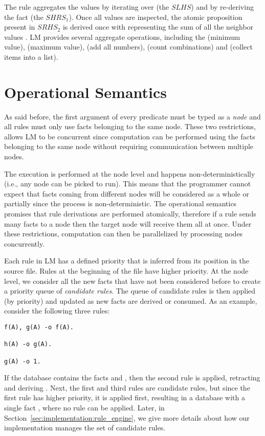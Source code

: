 The rule aggregates the values  by iterating over
 (the $SLHS$) and by re-deriving the
fact  (the $SHRS_1$). Once all
values are inspected, the atomic proposition  present in
$SRHS_2$ is derived once with  representing the sum of all the
neighbor values . LM provides several aggregate operations, including the
 (minimum value),  (maximum value),  (add all
numbers),  (count combinations) and  (collect items
into a list).

\section{Operational Semantics}

As said before, the first argument of every predicate must be typed as a
\emph{node} and all rules must only use facts belonging to the same node. These
two restrictions, allows LM to be concurrent since computation can be performed
using the facts belonging to the same node without requiring communication
between multiple nodes.

The execution is performed at the node level and happens non-deterministically
(i.e., any node can be picked to run). This means that the programmer cannot
expect that facts coming from different nodes will be considered as a whole or
partially since the process is non-deterministic. The operational semantics
promises that rule derivations are performed atomically, therefore if a rule
sends many facts to a node then the target node will receive them all at once.
Under these restrictions, computation can then be parallelized by processing
nodes concurrently.

Each rule in LM has a defined priority that is inferred from its position in the
source file.  Rules at the beginning of the file have higher priority. At the
node level, we consider all the new facts that have not been considered before
to create a priority queue of \emph{candidate rules}. The queue of candidate
rules is then applied (by priority) and updated as new facts are derived or
consumed. As an example, consider the following three rules:

\begin{Verbatim}[fontsize=\codesize]
f(A), g(A) -o f(A).

h(A) -o g(A).

g(A) -o 1.
\end{Verbatim}

If the database contains the facts  and , then the
second rule is applied, retracting  and deriving . Next,
the first and third rules are candidate rules, but since the first rule has
higher priority, it is applied first, resulting in a database with a single fact
, where no rule can be applied. Later, in
Section~\ref{sec:implementation:rule_engine}, we give more details about how our
implementation manages the set of candidate rules.

